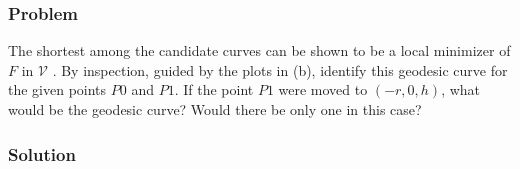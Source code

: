 \documentclass[12pt,twoside]{article}
\begin{document}
\subsubsection*{Problem}
The shortest among the candidate curves can be shown to be a local minimizer of
$F$ in $\mathcal{V}$ . By inspection, guided by the plots in (b), identify this
geodesic curve for the given points $P0$ and $P1$. If the point $P1$ were moved
to $(−r,0,h)$, what would be the geodesic curve? Would there be only one in this
case?

\subsubsection*{Solution}
\todo{}
\end{document}
